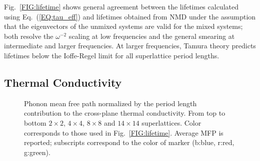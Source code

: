 Fig.~\ref{FIG:lifetime} shows general agreement between the lifetimes calculated using Eq.~(\ref{EQ:tau_eff}) and lifetimes obtained from NMD under the assumption that the eigenvectors of the unmixed systems are valid for the mixed systems; both resolve the $\omega^{-2}$ scaling at low frequencies and the general smearing at intermediate and larger frequencies. At larger frequencies, Tamura theory predicts lifetimes below the Ioffe-Regel limit for all superlattice period lengths.
\begin{comment}
\begin{table}
\begin{center}
\begin{tabular*}{\textwidth}{c@{\extracolsep{\fill}}ccccc}
\hline\hline\noalign{\smallskip}
&\multicolumn{3}{c}{$N\times N$ Superlattice} \\
\cline{2-5}\noalign{\smallskip}
\hspace{1cm} & $2\times2$ & $4\times4$ & $8\times8$ & $14\times14$  \\
\noalign{\smallskip}\hline\noalign{\smallskip}
RMSE $\sqrt{\frac{\sum_{\pmb{\kappa}\nu}(\tau_{eff}\kv-\tau_{mixed}\kv)^2}{n}}$ &0.65 & 1.21 & 2.09 & 5.42\\
Mean $\overline{\tau_{mixed}\kv}$ &1.37 & 1.93 & 2.74 & 3.40\\
Standard Deviation $\sigma[\tau_{mixed}\kv]$ &2.34 & 2.66 & 5.53 & 11.84\\
\noalign{\smallskip}\hline\hline
\end{tabular*}
\end{center}
\renewcommand{\table}{Table.}
\caption{The root-mean-square error between Tamura theory effective lifetimes and NMD mixed lifetimes. The mean and standard deviation of the NMD mixed lifetimes are provided for context. %
}
\label{TB:taud}
\end{table}
\end{comment}

\subsection{Thermal Conductivity}

\begin{figure}%
\begin{center}
\renewcommand{\figure}{Fig.}
\caption{Phonon mean free path normalized by the period length contribution to the cross-plane thermal conductivity. From top to bottom $2\times2$, $4\times4$, $8\times8$ and $14\times14$ superlattices. Color corresponds to those used in Fig.~\ref{FIG:lifetime}. Average MFP is reported; subscripts correspond to the color of marker (b:blue, r:red, g:green).}
\label{FIG:MFP_cp}
\end{center}
\end{figure}

